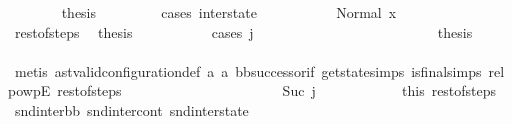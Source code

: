 \begin{isabellebody}
\isanewline
\ \ \ \ \ \ \isamarkupfalse%
\ {\isacharquery}{\kern0pt}thesis\ \isanewline
\ \ \ \ \ \ \isamarkupfalse%
\ {\isacharparenleft}{\kern0pt}cases\ inter{\isacharunderscore}{\kern0pt}state{\isacharparenright}{\kern0pt}\isanewline
\ \ \ \ \ \ \ \ \isamarkupfalse%
\ {}{\isacharcolon}{\kern0pt}\ {\isacharparenleft}{\kern0pt}Normal\ x{}{\isacharparenright}{\kern0pt}\isanewline
\ \ \ \ \ \ \ \ \isamarkupfalse%
\ rest{\isacharunderscore}{\kern0pt}of{\isacharunderscore}{\kern0pt}steps\ \isamarkupfalse%
\ {\isacharquery}{\kern0pt}thesis\ \isanewline
\ \ \ \ \ \ \ \ \isamarkupfalse%
\ {\isacharparenleft}{\kern0pt}cases\ j{\isacharprime}{\kern0pt}{\isacharparenright}{\kern0pt}\isanewline
\ \ \ \ \ \ \ \ \ \ \isamarkupfalse%
\ {}\isanewline
\ \ \ \ \ \ \ \ \ \ \isamarkupfalse%
\ \isamarkupfalse%
\ {\isacharquery}{\kern0pt}thesis\ \isanewline
\ \ \ \ \ \ \ \ \ \ \ \ \isamarkupfalse%
\ {\isacharparenleft}{\kern0pt}metis\ ast{\isacharunderscore}{\kern0pt}valid{\isacharunderscore}{\kern0pt}configuration{\isacharunderscore}{\kern0pt}def\ a{}\ a{}\ bb{\isacharunderscore}{\kern0pt}successor{\isacharunderscore}{\kern0pt}if\ get{\isacharunderscore}{\kern0pt}state{\isachardot}{\kern0pt}simps\ is{\isacharunderscore}{\kern0pt}final{\isachardot}{\kern0pt}simps{\isacharparenleft}{\kern0pt}{}{\isacharparenright}{\kern0pt}\ relpowp{\isacharunderscore}{\kern0pt}{}{\isacharunderscore}{\kern0pt}E\ rest{\isacharunderscore}{\kern0pt}of{\isacharunderscore}{\kern0pt}steps{\isacharparenright}{\kern0pt}\ \isanewline
\ \ \ \ \ \ \ \ \isamarkupfalse%
\isanewline
\ \ \ \ \ \ \ \ \ \ \isamarkupfalse%
\ {}{\isacharcolon}{\kern0pt}\ {\isacharparenleft}{\kern0pt}Suc\ j{\isacharprime}{\kern0pt}{\isacharprime}{\kern0pt}{\isacharparenright}{\kern0pt}\isanewline
\ \ \ \ \ \ \ \ \ \ \isamarkupfalse%
\ this\ rest{\isacharunderscore}{\kern0pt}of{\isacharunderscore}{\kern0pt}steps\ \isamarkupfalse%
\ snd{\isacharunderscore}{\kern0pt}inter{\isacharunderscore}{\kern0pt}bb\ snd{\isacharunderscore}{\kern0pt}inter{\isacharunderscore}{\kern0pt}cont\ snd{\isacharunderscore}{\kern0pt}inter{\isacharunderscore}{\kern0pt}state\ \isanewline

\end{isabellebody}
